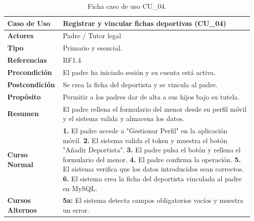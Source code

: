         \begin{table}[htbp]
        \centering
        \footnotesize
        \renewcommand{\arraystretch}{0.9}
        \begin{tabularx}{\textwidth}{|l|X|}
        \hline
        \rowcolor[HTML]{EFEFEF} 
        \textbf{Caso de Uso} & \textbf{Registrar y vincular fichas deportivas (CU\_04)} \\ \hline
        \textbf{Actores} & Padre / Tutor legal \\ \hline
        \textbf{Tipo} & Primario y esencial. \\ \hline        
        \textbf{Referencias} & RF1.4 \\ \hline
        \textbf{Precondición} & El padre ha iniciado sesión y su cuenta está activa. \\ \hline
        \textbf{Postcondición} & Se crea la ficha del deportista y se vincula al padre. \\ \hline
        \textbf{Propósito} & Permitir a los padres dar de alta a sus hijos bajo su tutela. \\ \hline
        \textbf{Resumen} & El padre rellena el formulario del menor desde su perfil móvil y el sistema valida y almacena los datos. \\ \hline
        \textbf{Curso Normal} & 
        \textbf{1.} El padre accede a "Gestionar Perfil" en la aplicación móvil.\newline
        \textbf{2.} El sistema valida el token y muestra el botón "Añadir Deportista".\newline
        \textbf{3.} El padre pulsa el botón y rellena el formulario del menor.\newline
        \textbf{4.} El padre confirma la operación.\newline
        \textbf{5.} El sistema verifica que los datos introducidos sean correctos.\newline
        \textbf{6.} El sistema crea la ficha del deportista vinculada al padre en MySQL. \\ \hline
        \textbf{Cursos Alternos} & 
        \textbf{5a:} El sistema detecta campos obligatorios vacíos y muestra un error. \\ \hline
        \end{tabularx}
        \caption{Ficha caso de uso CU\_04.}
        \label{tab:cu_04}
        \end{table}
        
